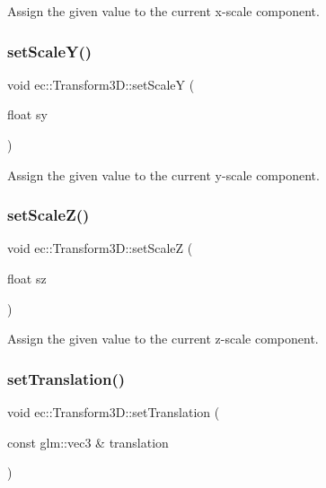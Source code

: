 Assign the given value to the current x-\/scale component. \mbox{\label{classec_1_1_transform3_d_a599ea97d84a88467abec94a30339f73e}} 
\subsubsection{\texorpdfstring{set\+Scale\+Y()}{setScaleY()}}
{\footnotesize\ttfamily void ec\+::\+Transform3\+D\+::set\+ScaleY (\begin{DoxyParamCaption}\item[{float}]{sy }\end{DoxyParamCaption})}

Assign the given value to the current y-\/scale component. \mbox{\label{classec_1_1_transform3_d_a1a71c829c953e5585623696fd7a4624d}} 
\subsubsection{\texorpdfstring{set\+Scale\+Z()}{setScaleZ()}}
{\footnotesize\ttfamily void ec\+::\+Transform3\+D\+::set\+ScaleZ (\begin{DoxyParamCaption}\item[{float}]{sz }\end{DoxyParamCaption})}

Assign the given value to the current z-\/scale component. \mbox{\label{classec_1_1_transform3_d_a2866183fe28eb5e5360d156830b00655}} 
\subsubsection{\texorpdfstring{set\+Translation()}{setTranslation()}\hspace{0.1cm}{\footnotesize\ttfamily [1/2]}}
{\footnotesize\ttfamily void ec\+::\+Transform3\+D\+::set\+Translation (\begin{DoxyParamCaption}\item[{const glm\+::vec3 \&}]{translation }\end{DoxyParamCaption})}

